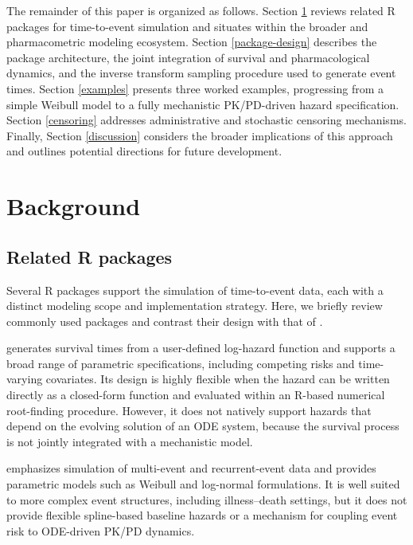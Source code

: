 The remainder of this paper is organized as follows. Section \ref{background} reviews related R packages for time-to-event simulation and situates  within the broader  and pharmacometric modeling ecosystem. Section \ref{package-design} describes the package architecture, the joint integration of survival and pharmacological dynamics, and the inverse transform sampling procedure used to generate event times. Section \ref{examples} presents three worked examples, progressing from a simple Weibull model to a fully mechanistic PK/PD-driven hazard specification. Section \ref{censoring} addresses administrative and stochastic censoring mechanisms. Finally, Section \ref{discussion} considers the broader implications of this approach and outlines potential directions for future development.

\section{Background}\label{background}

\subsection{Related R packages}\label{related-r-packages}

Several R packages support the simulation of time-to-event data, each with a distinct modeling scope and implementation strategy. Here, we briefly review commonly used packages and contrast their design with that of .

 \citep{simsurv} generates survival times from a user-defined log-hazard function and supports a broad range of parametric specifications, including competing risks and time-varying covariates. Its design is highly flexible when the hazard can be written directly as a closed-form function and evaluated within an R-based numerical root-finding procedure. However, it does not natively support hazards that depend on the evolving solution of an ODE system, because the survival process is not jointly integrated with a mechanistic model.

 \citep{survsim} emphasizes simulation of multi-event and recurrent-event data and provides parametric models such as Weibull and log-normal formulations. It is well suited to more complex event structures, including illness--death settings, but it does not provide flexible spline-based baseline hazards or a mechanism for coupling event risk to ODE-driven PK/PD dynamics.

